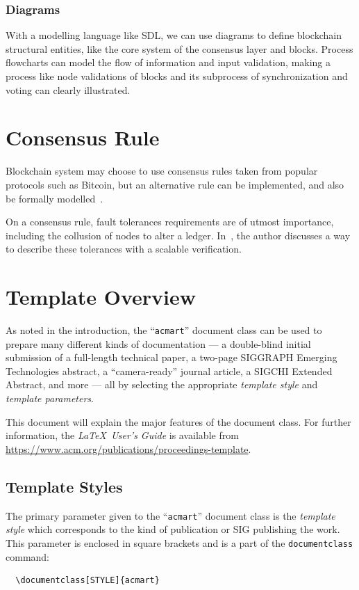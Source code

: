 \documentclass[sigconf, nonacm]{acmart}
\begin{document}
  \subsubsection{Diagrams}
  With a modelling language like SDL, we can use diagrams to define blockchain structural entities, like the core system of the consensus layer
  and blocks. Process flowcharts can model the flow of information and input validation, making a process like
  node validations of blocks and its subprocess of synchronization and voting can clearly illustrated.

\section{Consensus Rule}
Blockchain system may choose to use consensus rules taken from popular protocols such as Bitcoin,
but an alternative rule can be implemented, and also be formally modelled~\cite{Kawahara2020}.

On a consensus rule, fault tolerances requirements are of utmost importance, including the collusion of nodes to alter a ledger.
In~\cite{Kawahara2020}, the author discusses a way to describe these tolerances with a scalable verification.

\section{Template Overview}
As noted in the introduction, the ``\verb|acmart|'' document class can
be used to prepare many different kinds of documentation --- a
double-blind initial submission of a full-length technical paper, a
two-page SIGGRAPH Emerging Technologies abstract, a ``camera-ready''
journal article, a SIGCHI Extended Abstract, and more --- all by
selecting the appropriate {\itshape template style} and {\itshape
    template parameters}.

This document will explain the major features of the document
class. For further information, the {\itshape \LaTeX\ User's Guide} is
available from
\url{https://www.acm.org/publications/proceedings-template}.

\subsection{Template Styles}

The primary parameter given to the ``\verb|acmart|'' document class is
the {\itshape template style} which corresponds to the kind of publication
or SIG publishing the work. This parameter is enclosed in square
brackets and is a part of the {\verb|documentclass|} command:
\begin{verbatim}
  \documentclass[STYLE]{acmart}
\end{verbatim}
\end{document}
